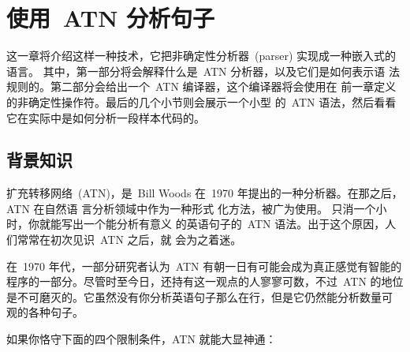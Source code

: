 
\chapter{使用~ATN 分析句子}
\label{chap:parsing_with_atns}

这一章将介绍这样一种技术，它把非确定性分析器~(parser)  实现成一种嵌入式的语言。
其中，第一部分将会解释什么是~\textsc{ATN} 分析器，以及它们是如何表示语
法规则的。第二部分会给出一个~\textsc{ATN} 编译器，这个编译器将会使用在
前一章定义的非确定性操作符。最后的几个小节则会展示一个小型
的~\textsc{ATN} 语法，然后看看它在实际中是如何分析一段样本代码的。

\section{背景知识}
\label{sec:background}

扩充转移网络~(\textsc{ATN})，是~Bill Woods 在~1970 年提出的一种分析器。在那之后，\textsc{ATN} 在自然语
言分析领域中作为一种形式
化方法，被广为使用。 只消一个小时，你就能写出一个能分析有意义
的英语句子的~\textsc{ATN} 语法。出于这个原因，人们常常在初次见识~\textsc{ATN} 之后，就
会为之着迷。

在~1970 年代，一部分研究者认为~\textsc{ATN} 有朝一日有可能会成为真正感觉有智能的
程序的一部分。尽管时至今日，还持有这一观点的人寥寥可数，不过~ATN 的地位
是不可磨灭的。它虽然没有你分析英语句子那么在行，但是它仍然能分析数量可
观的各种句子。

如果你恪守下面的四个限制条件，\textsc{ATN} 就能大显神通：

